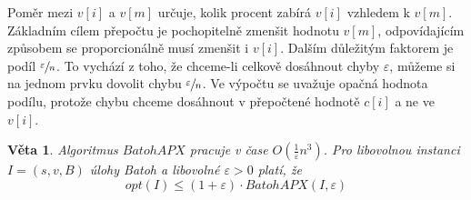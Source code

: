 \documentclass[11pt]{report} %
\newtheorem{theorem}{Věta}[section]
\numberwithin{equation}{section}
\begin{document}
Poměr mezi $v[i]$ a $v[m]$ určuje, kolik procent zabírá $v[i]$ vzhledem k $v[m]$. Základním cílem přepočtu je pochopitelně zmenšit hodnotu $v[m]$, odpovídajícím způsobem se proporcionálně musí zmenšit i $v[i]$. Dalším důležitým faktorem je podíl $\sfrac{\varepsilon}{n}$. To vychází z toho, že chceme-li celkově dosáhnout chyby $\varepsilon$, můžeme si na jednom prvku dovolit chybu $\sfrac{\varepsilon}{n}$. Ve výpočtu se uvažuje opačná hodnota podílu, protože chybu chceme dosáhnout v přepočtené hodnotě $c[i]$ a ne ve $v[i]$.

\begin{theorem}
Algoritmus $BatohAPX$ pracuje v čase $O(\frac{1}{\varepsilon}n^3)$. Pro libovolnou instanci $I = (s, v, B)$ úlohy Batoh a libovolné $\varepsilon > 0$ platí, že 
$$opt(I) \leq (1 + \varepsilon)\cdot BatohAPX(I, \varepsilon)$$
\end{theorem}
\end{document}
